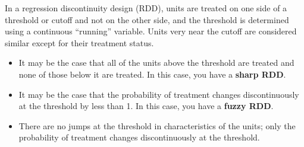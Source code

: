 \documentclass[10pt,a4paper]{protocol}
\begin{document}







\begin{fullwidth}
\makeheader
\end{fullwidth}

In a regression discontinuity design (RDD), units are treated on one side of a threshold or cutoff and not on the other side, and the threshold is determined using a continuous ``running'' variable. Units very near the cutoff are considered similar except for their treatment status.


\begin{itemize}
	\item It may be the case that all of the units above the threshold are treated and none of those below it are treated. In this case, you have a \textbf{sharp RDD}.
	\item It may be the case that the probability of treatment changes discontinuously at the threshold by less than 1. In this case, you have a \textbf{fuzzy RDD}. 
\end{itemize}
\divider

\begin{itemize}
	\item There are no jumps at the threshold in characteristics of the units; only the probability of treatment changes discontinuously at the threshold. 
\end{itemize}
\divider
\end{document}

